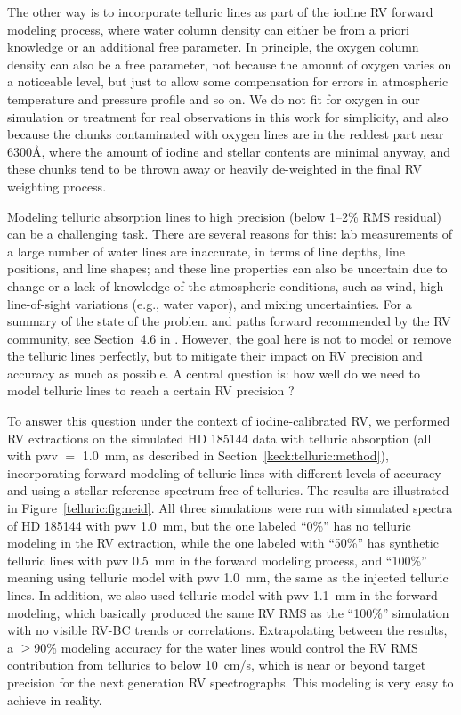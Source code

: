 The other way is to incorporate telluric lines as part of the iodine
RV forward modeling process, where water column density can either be
from a priori knowledge or an additional free parameter. In principle,
the oxygen column density can also be a free parameter, not because
the amount of oxygen varies on a noticeable level, but just to allow
some compensation for errors in atmospheric temperature and pressure
profile and so on. We do not fit for oxygen in our simulation or
treatment for real observations in this work for simplicity, and also
because the chunks contaminated with oxygen lines are in the reddest
part near 6300\AA, where the amount of iodine and stellar contents are
minimal anyway, and these chunks tend to be thrown away or heavily
de-weighted in the final RV weighting process.

Modeling telluric absorption lines to high precision (below 1--2\% RMS
residual) can be a challenging task. There are several reasons for
this: lab measurements of a large number of water lines are
inaccurate, in terms of line depths, line positions, and line shapes;
and these line properties can also be uncertain due to change or a
lack of knowledge of the atmospheric conditions, such as wind, high
line-of-sight variations (e.g., water vapor), and mixing
uncertainties. For a summary of the state of the problem and paths
forward recommended by the RV community, see Section~4.6 in
\cite{eprv2015}. However, the goal here is not to model or remove
the telluric lines perfectly, but to mitigate their impact on RV
precision and accuracy as much as possible. A central question is: how
well do we need to model telluric lines to reach a certain RV
precision \citep{eprv2015}?

To answer this question under the context of iodine-calibrated RV, we
performed RV extractions on the simulated HD 185144 data with telluric
absorption (all with pwv $=$ 1.0~mm, as described in
Section~\ref{keck:telluric:method}), incorporating forward modeling of
telluric lines with different levels of accuracy and using a stellar
reference spectrum free of tellurics. The results are illustrated in
Figure~\ref{telluric:fig:neid}. All three simulations were run with
simulated spectra of HD 185144 with pwv 1.0~mm, but the one labeled
``0\%'' has no telluric modeling in the RV extraction, while the one
labeled with ``50\%'' has synthetic telluric lines with pwv 0.5~mm in
the forward modeling process, and ``100\%'' meaning using telluric
model with pwv 1.0~mm, the same as the injected telluric lines. In
addition, we also used telluric model with pwv 1.1~mm in the forward
modeling, which basically produced the same RV RMS as the ``100\%''
simulation with no visible RV-BC trends or correlations. Extrapolating
between the results, a $\geq$90\% modeling accuracy for the water
lines would control the RV RMS contribution from tellurics to below
10~cm/s, which is near or beyond target precision for the next
generation RV spectrographs. This modeling is very easy to achieve in
reality.

